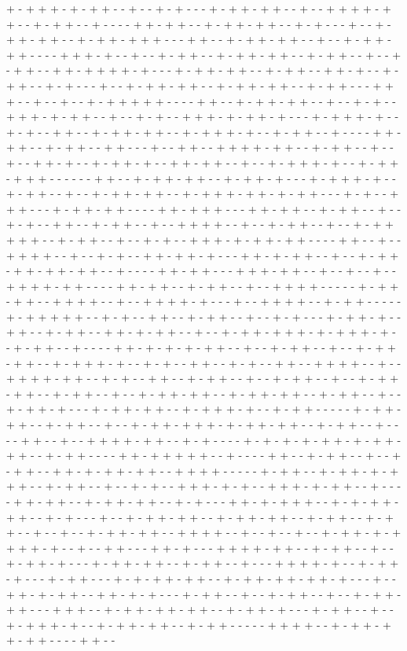 + - + + + - + - + + - - + - - + - + - - - + - + + - + + - - + - - + + + + - + + - - + - + + - - + - - - - + + - + + - - + - + + - + + - - + - + - - - + - - + - + + - + + - - + - + + - + + + - - - + + - - + - + + - + + - - + - - + - + + - + + - - - - + + + - + - - + - - + - + + - - + - + + - + + - - + - + + - - + - - + - + + - - + + - + + + + - + - - - + - + + - + + - - + - + + - - + + - + - - + - + + - - + - + - - - + - - + - + + - + + - - + - + + - + + - - + - + + - - - + + + - - + - - + - - + - + + + + + - - - - + + - - + - + + - + + - - + - - + - + - - + + + - + - + + - - + - - + - + - - + + + - + - + + - + - - - + - + + + - + - - + - + - - + + - - + - + + - + + - - + - + + + - + - - + - + + - - + - - - - + + - + + - - + - + + - - + + - - - + - - + + - - + + + + - + + - - + - + + - - + - - + - - + + - + - - + - + + - + - - + + - + + - - + - - + - + + + - + - - + - + + - + + + - - - - - - + + - - + - + + - + + - - + - + + - + - - - + - + + + - + - - + - + + - - + - - + - + + - + + - - + - + + + - + + - + - + + - - - + - + - - + + + - - - + - + + - + + - - - - + + - + + + - - - + + - + + - - + - + + - - + - - + - + - - + + - - + - + + - - + - - + + + + - - + - - + - + + - - + - - + - + + + + + - - + - + + - - + - - + - + - - + + + - + - + + - + + - - - - + + - - + - - + + + + - - + - - + - + - - + + - + + - + - - - + + - + - + + - - + - - + - + + - + + - + + - + + - - + - - - - + + - + + - - - + + + - + + - - + - - + - - + - - + + + + - + + - - - - + + - + + - - + - + + - - + - - + + + + - - - - - + - + + - + + - - + + + + - - + - - + + + + - + - - - + - - + + + + - - + - + + - - - - - + - + + + + + - - + - + - - + + - - + - + + - - + - - + - + - - - + - + + - + - - + + - - + - + + - - + + - + - + + - - + - - + - + + - + + + - + - + + + - + - - + - + + - - + - - - - + + - + - + - + - + + - - + - - + - + + - - + - - + - + + - + + - - + - + + + - + - - + - + - - + + - - + - + - - + + - - + + + + - - + - - + + + + - + + - - + - + - - + + - - + - + + - - + - - + - + + - - + - - + - + + - + + - - + - + + - - + - - + - + + - + + - - + - + + - + + - - + - + + - - + - - + - + + - + - - - + - + + - + + - - + - + + + - + - - + - + + - - - - - + - + + - + + - - + - + + - - + - - + - + + - + + + - + - + + - + + - - + - + + - - + - - - - + + - - + - - + + + + - + + - - + - + - - - - + - + - + - + - + + - + - + + - + + - - + - + + - - - - + + - + + + + + - - + - - - - + + - - + - + + - - + - - + - + + - - + + - + - + + - + + - - + + + + - - - - - + - + + - - + - + + - + - + + + - - + - + + - - + - - + - + - - + + + - + - + - - + + + - + - + + - - + - - - - + + - + + - - + - + + - + + - - + - + - - - + + - + - + + + - - + - + - + + - + + - - + - + - - - + - - + - + + - + + - - + - + + - + + - - + - + + - - + - + + - - + - - + - - + - + + - + + - - + + + + - - + - - + - - + - - + - + + - + - + + + + - + - - + - - + + - - - + + - + - - - + + + + - + + - - + - + + - - + - - + - + + - + - - - + - + + - + + - - + - + + - - + - - - + + + + - + - - + - + + - + - - - + - + + - - - + - + - + + - + + - - + - + + - + + - + + - + - - - + - - + + - + - + + - - + + - + - + - - - + - + + - - + - - + - + + - - + - - + - + + - + + - - - + + + - - + - + + - + + - + + - - + - + + - + - - - + - + + - - + - - + - + + + - + - - + - + + - + + - - + - + + - - - - - + + + + - - + - + + - + + - + + - - - - + + - - 